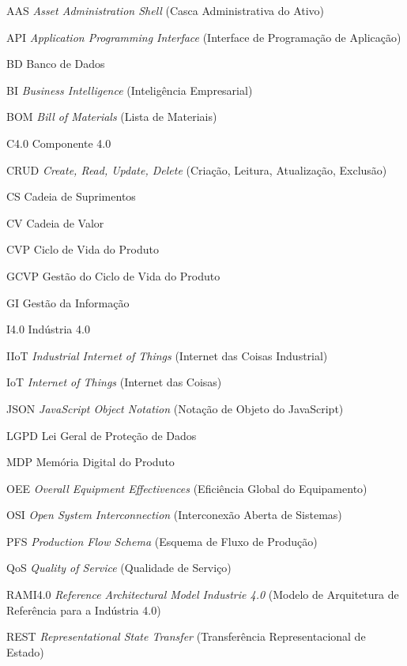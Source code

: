 \begin{siglas}
	\item[AAS] \textit{Asset Administration Shell} (Casca Administrativa do Ativo)
	\item[API] \textit{Application Programming Interface} (Interface de Programação de Aplicação)
	\item[BD] Banco de Dados
	\item[BI] \textit{Business Intelligence} (Inteligência Empresarial)
	\item[BOM] \textit{Bill of Materials} (Lista de Materiais)
	\item[C4.0] Componente 4.0
	\item[CRUD] \textit{Create, Read, Update, Delete} (Criação, Leitura, Atualização, Exclusão)
	\item[CS] Cadeia de Suprimentos
	\item[CV] Cadeia de Valor
	\item[CVP] Ciclo de Vida do Produto
	\item[GCVP] Gestão do Ciclo de Vida do Produto
	\item[GI] Gestão da Informação
	\item[I4.0] Indústria 4.0
	\item[IIoT] \textit{Industrial Internet of Things} (Internet das Coisas Industrial)
	\item[IoT] \textit{Internet of Things} (Internet das Coisas)
	\item[JSON] \textit{JavaScript Object Notation} (Notação de Objeto do JavaScript)
	\item[LGPD] Lei Geral de Proteção de Dados
	\item[MDP] Memória Digital do Produto
	\item[OEE] \textit{Overall Equipment Effectivences} (Eficiência Global do Equipamento)
	\item[OSI] \textit{Open System Interconnection} (Interconexão Aberta de Sistemas)
	\item[PFS] \textit{Production Flow Schema} (Esquema de Fluxo de Produção)
	\item[QoS] \textit{Quality of Service} (Qualidade de Serviço)
	\item[RAMI4.0] \textit{Reference Architectural Model Industrie 4.0} (Modelo de Arquitetura de Referência para a Indústria 4.0)
	\item[REST] \textit{Representational State Transfer} (Transferência Representacional de Estado)

\end{siglas}
